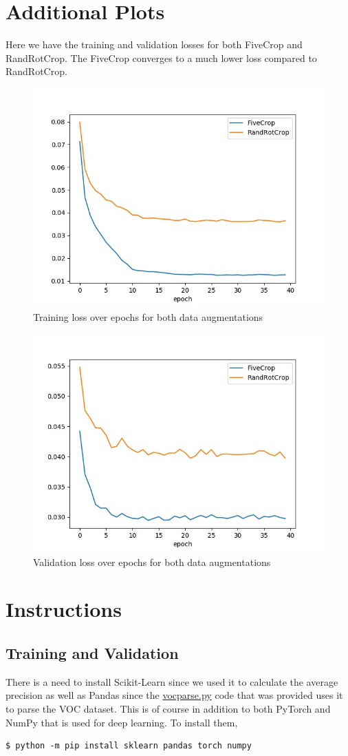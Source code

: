\documentclass{article}
\begin{document}
\section{Additional Plots}
Here we have the training and validation losses for both FiveCrop and RandRotCrop. The FiveCrop converges to a much lower loss compared to RandRotCrop.
\begin{figure}[H]
    \centering
    \includegraphics[width=.7\textwidth]{train_loss.jpg}
    \caption{Training loss over epochs for both data augmentations}
    \label{fig:train_loss}
\end{figure}%
\begin{figure}[H]
    \centering
    \includegraphics[width=.7\textwidth]{val_loss.jpg}
    \caption{Validation loss over epochs for both data augmentations}
    \label{fig:val_loss}
\end{figure}

\newpage
\section{Instructions}
\subsection{Training and Validation}
There is a need to install Scikit-Learn since we used it to calculate the average precision as well as Pandas since the \url{vocparse.py} code that was provided uses it to parse the VOC dataset. This is of course in addition to both PyTorch and NumPy that is used for deep learning. To install them,
\begin{lstlisting}
$ python -m pip install sklearn pandas torch numpy
\end{lstlisting}
\end{document}
